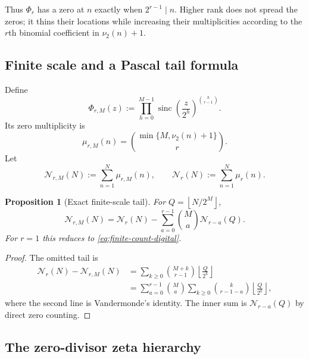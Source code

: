 \documentclass[11pt,a4paper]{article}
\theoremstyle{frontier}
\newtheorem{proposition}[theorem]{Proposition}
\theoremstyle{definition}
\newcommand{\sinc}{\operatorname{sinc}}
\newcommand{\floor}[1]{\left\lfloor #1\right\rfloor}
\begin{document}
Thus $\Phi_r$ has a zero at $n$ exactly when $2^{r-1}\mid n$.  Higher rank does not spread the zeros; it thins their locations while increasing their multiplicities according to the $r$th binomial coefficient in $\nu_2(n)+1$.

\subsection{Finite scale and a Pascal tail formula}

Define
\begin{equation}\label{eq:finite-phir}
  \Phi_{r,M}(z):=\prod_{h=0}^{M-1}
  \sinc\!\left(\frac z{2^h}\right)^{\binom h{r-1}}.
\end{equation}
Its zero multiplicity is
\begin{equation}\label{eq:finite-mu-r}
  \mu_{r,M}(n)=\binom{\min\{M,\nu_2(n)+1\}}{r}.
\end{equation}
Let
\[
 \mathcal N_{r,M}(N):=\sum_{n=1}^{N}\mu_{r,M}(n),
 \qquad
 \mathcal N_r(N):=\sum_{n=1}^{N}\mu_r(n).
\]

\begin{proposition}[Exact finite-scale tail]\label{prop:finite-tail-r}
For $Q=\floor{N/2^M}$,
\begin{equation}\label{eq:finite-tail-r}
 \mathcal N_{r,M}(N)
 =\mathcal N_r(N)-\sum_{a=0}^{r-1}\binom Ma\mathcal N_{r-a}(Q).
\end{equation}
For $r=1$ this reduces to \eqref{eq:finite-count-digital}.
\end{proposition}

\begin{proof}
The omitted tail is
\begin{align*}
 \mathcal N_r(N)-\mathcal N_{r,M}(N)
 &=\sum_{k\ge0}\binom{M+k}{r-1}\floor{\frac Q{2^k}}\\
 &=\sum_{a=0}^{r-1}\binom Ma
   \sum_{k\ge0}\binom{k}{r-1-a}\floor{\frac Q{2^k}},
\end{align*}
where the second line is Vandermonde's identity.  The inner sum is $\mathcal N_{r-a}(Q)$ by direct zero counting.
\end{proof}

\subsection{The zero-divisor zeta hierarchy}
\end{document}
